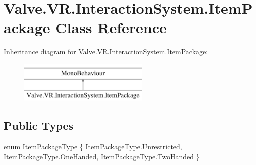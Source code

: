 \hypertarget{class_valve_1_1_v_r_1_1_interaction_system_1_1_item_package}{}\section{Valve.\+V\+R.\+Interaction\+System.\+Item\+Package Class Reference}
\label{class_valve_1_1_v_r_1_1_interaction_system_1_1_item_package}
Inheritance diagram for Valve.\+V\+R.\+Interaction\+System.\+Item\+Package\+:\begin{figure}[H]
\begin{center}
\leavevmode
\includegraphics[height=2.000000cm]{class_valve_1_1_v_r_1_1_interaction_system_1_1_item_package}
\end{center}
\end{figure}
\subsection*{Public Types}
\begin{DoxyCompactItemize}
\item 
enum \mbox{\hyperlink{class_valve_1_1_v_r_1_1_interaction_system_1_1_item_package_a8d2fe408f7b1222964bcb4efe22ff9a4}{Item\+Package\+Type}} \{ \mbox{\hyperlink{class_valve_1_1_v_r_1_1_interaction_system_1_1_item_package_a8d2fe408f7b1222964bcb4efe22ff9a4a89c6caacc7047b0a535412d7f939f870}{Item\+Package\+Type.\+Unrestricted}}, 
\mbox{\hyperlink{class_valve_1_1_v_r_1_1_interaction_system_1_1_item_package_a8d2fe408f7b1222964bcb4efe22ff9a4a43ad2fec960587795fa48698df92aacc}{Item\+Package\+Type.\+One\+Handed}}, 
\mbox{\hyperlink{class_valve_1_1_v_r_1_1_interaction_system_1_1_item_package_a8d2fe408f7b1222964bcb4efe22ff9a4a5f8d5fb749109ca0f9440a88b183f6ef}{Item\+Package\+Type.\+Two\+Handed}}
 \}
\end{DoxyCompactItemize}
